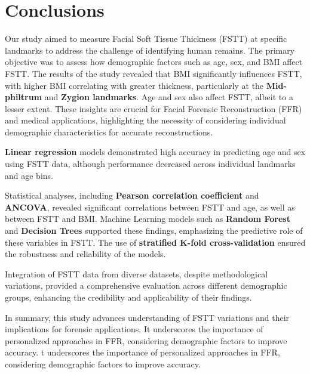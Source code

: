 \documentclass[journal,article,submit,pdftex,moreauthors]{Definitions/mdpi}
\begin{document}
\section{Conclusions}
\label{sec:conc}

Our study aimed to measure Facial Soft Tissue Thickness (FSTT) at specific landmarks to address the challenge of identifying human remains. The primary objective was to assess how demographic factors such as age, sex, and BMI affect FSTT. The results of the study revealed that BMI significantly influences FSTT, with higher BMI correlating with greater thickness, particularly at the \textbf{Mid-philtrum} and \textbf{Zygion landmarks}. Age and sex also affect FSTT, albeit to a lesser extent. These insights are crucial for Facial Forensic Reconstruction (FFR) and medical applications, highlighting the necessity of considering individual demographic characteristics for accurate reconstructions.

\textbf{Linear regression} models demonstrated high accuracy in predicting age and sex using FSTT data, although performance decreased across individual landmarks and age bins.

Statistical analyses, including \textbf{Pearson correlation coefficient} and \textbf{ANCOVA}, revealed significant correlations between FSTT and age, as well as between FSTT and BMI. Machine Learning models such as \textbf{Random Forest} and \textbf{Decision Trees} supported these findings, emphasizing the predictive role of these variables in FSTT. The use of \textbf{stratified K-fold cross-validation} ensured the robustness and reliability of the models.

Integration of FSTT data from diverse datasets, despite methodological variations, provided a comprehensive evaluation across different demographic groups, enhancing the credibility and applicability of their findings.

In summary, this study advances understanding of FSTT variations and their implications for forensic applications. It underscores the importance of personalized approaches in FFR, considering demographic factors to improve accuracy. t underscores the importance of personalized approaches in FFR, considering demographic factors to improve accuracy.

\vspace{6pt} 

\end{document}
